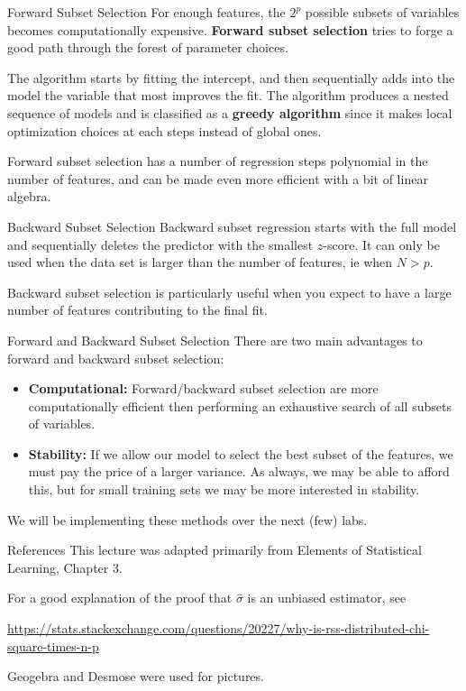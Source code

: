 \documentclass[10pt, table, dvipsnames,xcdraw, handout ]{beamer}
\begin{document}
\begin{frame}[fragile]{Forward Subset Selection}
For enough features, the $2^p$ possible subsets of variables becomes computationally expensive. \textbf{Forward subset selection} tries to forge a good path through the forest of parameter choices. \pause

The algorithm starts by fitting the intercept, and then sequentially adds into the model the variable that most improves the fit. The algorithm produces a nested sequence of models and is classified as a \textbf{greedy algorithm} since it makes local optimization choices at each steps instead of global ones. \pause

Forward subset selection has a number of regression steps polynomial in the number of features, and can be made even more efficient with a bit of linear algebra. 
\end{frame}



\begin{frame}[fragile]{Backward Subset Selection}
Backward subset regression starts with the full model and sequentially deletes the predictor with the smallest $z$-score. It can only be used when the data set is larger than the number of features, ie when $N>p$.

Backward subset selection is particularly useful when you expect to have a large number of features contributing to the final fit. 
\end{frame}


\begin{frame}[fragile]{Forward and Backward Subset Selection}
There are two main advantages to forward and backward subset selection:\pause

\begin{itemize}
\item[] \textbf{Computational:} Forward/backward subset selection are more computationally efficient then performing an exhaustive search of all subsets of variables.\pause
\item[] \textbf{Stability:} If we allow our model to select the best subset of the features, we must pay the price of a larger variance. As always, we may be able to afford this, but for small training sets we may be more interested in stability. 
\end{itemize}
We will be implementing these methods over the next (few) labs. 
\end{frame}



\begin{frame}[fragile]{References}
This lecture was adapted primarily from Elements of Statistical Learning, Chapter 3. 

For a good explanation of the proof that $\hat \sigma$ is an unbiased estimator, see

\url{https://stats.stackexchange.com/questions/20227/why-is-rss-distributed-chi-square-times-n-p}

Geogebra and Desmose were used for pictures. 

\end{frame}
\end{document}
